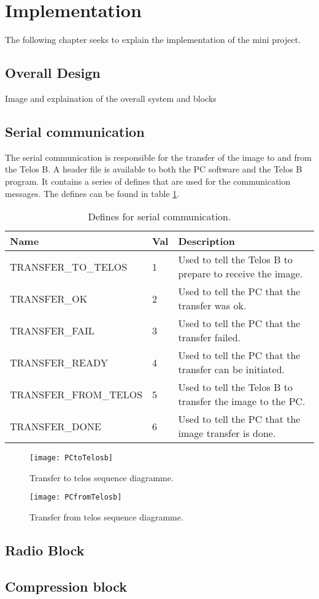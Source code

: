 \section{Implementation}
The following chapter seeks to explain the implementation of the mini project.\\

\subsection{Overall Design}
Image and explaination of the overall system and blocks\\

\subsection{Serial communication}
The serial communication is responsible for the transfer of the image to and from the Telos B. A header file is available to both the PC software and the Telos B program. It contains a series of defines that are used for the communication messages. The defines can be found in table \ref{definetable}.
\begin{table}[H]
    \begin{tabular}{|l|l|l|}
    \hline
    Name                  & Val & Description                                               \\ \hline
    TRANSFER\_TO\_TELOS   & 1     & Used to tell the Telos B to prepare to receive the image. \\ \hline
    TRANSFER\_OK          & 2     & Used to tell the PC that the transfer was ok.             \\ \hline
    TRANSFER\_FAIL        & 3     & Used to tell the PC that the transfer failed.             \\ \hline
    TRANSFER\_READY       & 4     & Used to tell the PC that the transfer can be initiated.   \\ \hline
    TRANSFER\_FROM\_TELOS & 5     & Used to tell the Telos B to transfer the image to the PC.  \\ \hline
    TRANSFER\_DONE        & 6     & Used to tell the PC that the image transfer is done.      \\ \hline
    \end{tabular}
    \caption{Defines for serial communication.}
    \label{definetable}
\end{table}
\begin{figure}[H]
	\centering
	\texttt{[image: PCtoTelosb]}
	\caption{Transfer to telos sequence diagramme.}
	\label{transfertotelos}
\end{figure}

\begin{figure}[H]
	\centering
	\texttt{[image: PCfromTelosb]}
	\caption{Transfer from telos sequence diagramme.}
	\label{transferfromtelos}
\end{figure}

\subsection{Radio Block}

\subsection{Compression block}


